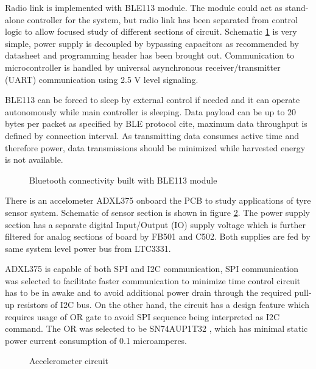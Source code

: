 Radio link is implemented with BLE113 module. The module could act as stand-alone controller for the system, but radio link has been separated from control logic to allow focused study of different sections of circuit.  Schematic  \ref{fig:bluetooth_circuit} is very simple, power supply is decoupled by bypassing capacitors as recommended by datasheet and programming header has been brought out. Communication to microcontroller is handled by universal asynchronous receiver/transmitter (UART) communication using 2.5 V level signaling. 

BLE113 can be forced to sleep by external control if needed and it can operate autonomously while main controller is sleeping. Data payload can be up to 20 bytes per packet as specified by BLE protocol {\color{red}cite}, maximum data throughput is defined by connection interval. As transmitting data consumes active time and therefore power, data transmissions should be minimized while harvested energy is not available.

\begin{figure}
    \centering
    \def\svgwidth{\columnwidth}
    
    \caption{\label{fig:bluetooth_circuit} Bluetooth connectivity built with BLE113 module}
\end{figure}

There is an accelometer ADXL375 onboard the PCB to study applications of tyre sensor system. Schematic of sensor section is shown in figure \ref{fig:sensor_circuit}. The power supply section has a separate digital Input/Output (IO) supply voltage which is further filtered for analog sections of board by FB501 and C502. Both supplies are fed by same system level power bus from LTC3331.

ADXL375 is capable of both SPI and I2C communication, SPI communication was selected to facilitate faster communication to minimize time control circuit has to be in awake and to avoid additional power drain through the required pull-up resistors of I2C bus. On the other hand, the circuit has a design feature which requires usage of OR gate to avoid SPI sequence being interpreted as I2C command. The OR was selected to be SN74AUP1T32 \cite{orgate}, which has minimal static power current consumption of 0.1 microamperes. 

\begin{figure}
    \centering
    \def\svgwidth{\columnwidth}
    
    \caption{\label{fig:sensor_circuit} Accelerometer circuit}
\end{figure}

